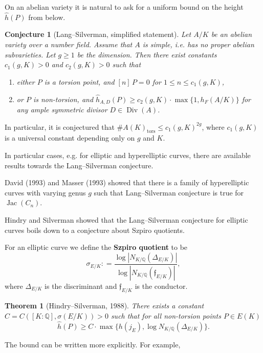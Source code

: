 \documentclass{article}
\newtheorem{conjecture}[proposition]{Conjecture}
\newtheorem{theorem}[proposition]{Theorem}
\theoremstyle{definition}
\DeclareMathOperator{\Div}{Div}
\DeclareMathOperator{\Jac}{Jac}
\newcommand{\term}{\textbf}
\newcommand{\dfn}{\mathrel{\mathop:}=}
\newcommand{\QQ}{\mathbb{Q}}
\begin{document}
On an abelian variety it is natural to ask for a uniform bound on the height
$\widehat{h} (P)$ from below.

\begin{conjecture}[Lang--Silverman, simplified statement]
  Let $A/K$ be an abelian variety over a number field. Assume that $A$ is
  simple, i.e. has no proper abelian subvarieties. Let $g \ge 1$ be the
  dimension. Then there exist constants $c_1 (g,K) > 0$ and $c_2 (g,K) > 0$ such
  that

  \begin{enumerate}
  \item[(1)] either $P$ is a torsion point, and $[n]\,P = 0$ for
    $1 \le n \le c_1 (g,K)$,

  \item[(2)] or $P$ is non-torsion, and
    $\widehat{h}_{A,D} (P) \ge c_2 (g,K) \cdot \max \{ 1, h_F (A/K) \}$ for any
    ample symmetric divisor $D \in \Div (A)$.
  \end{enumerate}
\end{conjecture}

In particular, it is conjectured that
$\# A (K)_\mathrm{tors} \le c_1 (g,K)^{2g}$, where $c_1 (g,K)$ is a universal
constant depending only on $g$ and $K$.

In particular cases, e.g. for elliptic and hyperelliptic curves, there are
available results towards the Lang--Silverman conjecture.

David (1993) and Masser (1993) showed that there is a family of hyperelliptic
curves with varying genus $g$ such that Lang--Silverman conjecture is true for
$\Jac (C_n)$.

Hindry and Silverman showed that the Lang--Silverman conjecture for elliptic
curves boils down to a conjecture about Szpiro quotients.

For an elliptic curve we define the \term{Szpiro quotient} to be
$$\sigma_{E/K} \dfn \frac{\log |N_{K/\QQ} (\Delta_{E/K})|}{\log |N_{K/\QQ} (\mathfrak{f}_{E/K})|},$$
where $\Delta_{E/K}$ is the discriminant and $\mathfrak{f}_{E/K}$ is the
conductor.

\begin{theorem}[Hindry--Silverman, 1988]
  There exists a constant $C = C ([K:\QQ], \sigma (E/K)) > 0$ such that for all
  non-torsion points $P\in E (K)$
  $$\widehat{h} (P) \ge C\cdot \max \{ h (j_E), \log N_{K/\QQ} (\Delta_{E/K}) \}.$$
\end{theorem}

The bound can be written more explicitly. For example,
\end{document}
